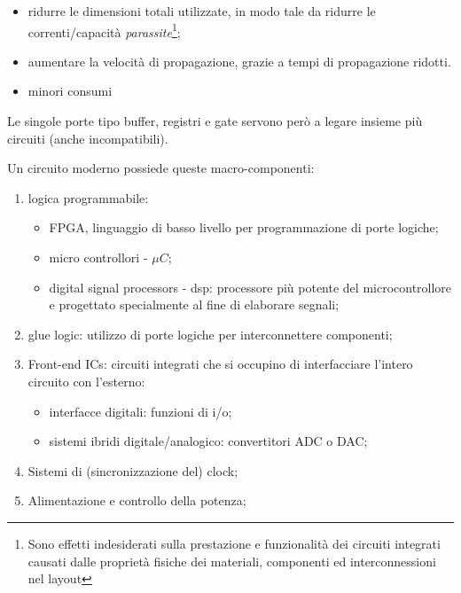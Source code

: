\documentclass[
]{book}
\providecommand{\tightlist}{%
  \setlength{\itemsep}{0pt}\setlength{\parskip}{0pt}}
\begin{document}
\begin{itemize}
\tightlist
\item
  ridurre le dimensioni totali utilizzate, in modo tale da ridurre le
  correnti/capacità \emph{parassite}\footnote{Sono effetti indesiderati
    sulla prestazione e funzionalità dei circuiti integrati causati
    dalle proprietà fisiche dei materiali, componenti ed
    interconnessioni nel layout};
\item
  aumentare la velocità di propagazione, grazie a tempi di propagazione
  ridotti.
\item
  minori consumi
\end{itemize}

Le singole porte tipo buffer, registri e gate servono però a legare
insieme più circuiti (anche incompatibili).

Un circuito moderno possiede queste macro-componenti:

\begin{enumerate}
\def\labelenumi{\arabic{enumi})}
\tightlist
\item
  logica programmabile:

  \begin{itemize}
  \tightlist
  \item
    FPGA, linguaggio di basso livello per programmazione di porte
    logiche;
  \item
    micro controllori - \(\mu C\);
  \item
    digital signal processors - dsp: processore più potente del
    microcontrollore e progettato specialmente al fine di elaborare
    segnali;
  \end{itemize}
\item
  glue logic: utilizzo di porte logiche per interconnettere componenti;
\item
  Front-end ICs: circuiti integrati che si occupino di interfacciare
  l'intero circuito con l'esterno:

  \begin{itemize}
  \tightlist
  \item
    interfacce digitali: funzioni di i/o;
  \item
    sistemi ibridi digitale/analogico: convertitori ADC o DAC;
  \end{itemize}
\item
  Sistemi di (sincronizzazione del) clock;
\item
  Alimentazione e controllo della potenza;
\end{enumerate}
\end{document}
